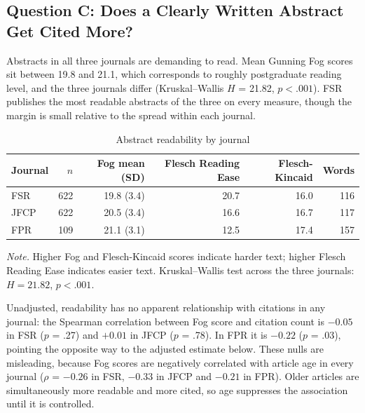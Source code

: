 \documentclass[11pt,a4paper]{article}
\newcommand{\tablenote}[1]{\par\smallskip\parbox{\linewidth}{\footnotesize\textit{Note.} #1}}
\begin{document}
\subsection{Question C: Does a Clearly Written Abstract Get Cited More?}\label{question-c-does-a-clearly-written-abstract-get-cited-more}

Abstracts in all three journals are demanding to read. Mean Gunning Fog scores sit between 19.8 and 21.1, which corresponds to roughly postgraduate reading level, and the three journals differ (Kruskal--Wallis \(H\) = 21.82, \(p < .001\)). FSR publishes the most readable abstracts of the three on every measure, though the margin is small relative to the spread within each journal.

\begin{table}[htbp]
\centering
\small
\caption{Abstract readability by journal}
\label{tab:qc_desc}
\begin{tabular}{lrrrrr}
\toprule
Journal & $n$ & Fog mean (SD) & Flesch Reading Ease & Flesch-Kincaid & Words \\
\midrule
FSR & 622 & 19.8 (3.4) & 20.7 & 16.0 & 116 \\
JFCP & 622 & 20.5 (3.4) & 16.6 & 16.7 & 117 \\
FPR & 109 & 21.1 (3.1) & 12.5 & 17.4 & 157 \\
\bottomrule
\end{tabular}
\tablenote{Higher Fog and Flesch-Kincaid scores indicate harder text; higher Flesch Reading Ease indicates easier text. Kruskal--Wallis test across the three journals: $H = 21.82$, $p < .001$.}
\end{table}

Unadjusted, readability has no apparent relationship with citations in any journal: the Spearman correlation between Fog score and citation count is \(-0.05\) in FSR (\(p\) = .27) and \(+0.01\) in JFCP (\(p\) = .78). In FPR it is \(-0.22\) (\(p\) = .03), pointing the opposite way to the adjusted estimate below. These nulls are misleading, because Fog scores are negatively correlated with article age in every journal (\(\rho\) = \(-0.26\) in FSR, \(-0.33\) in JFCP and \(-0.21\) in FPR). Older articles are simultaneously more readable and more cited, so age suppresses the association until it is controlled.
\end{document}
